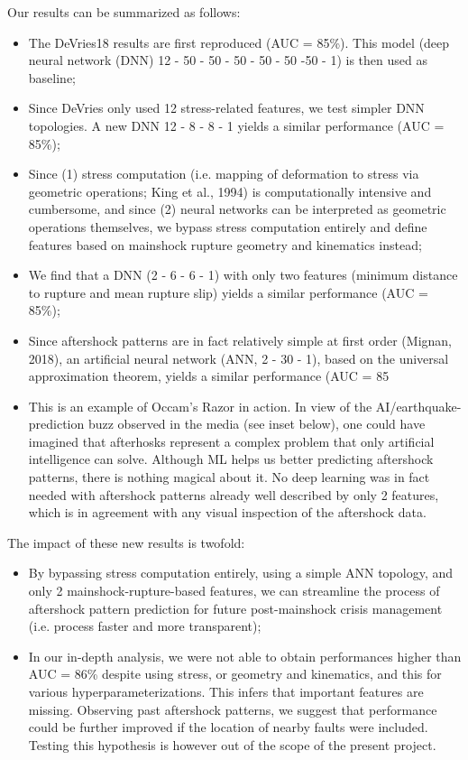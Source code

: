 \documentclass[journal,transmag]{IEEEtran}
\begin{document}
Our results can be summarized as follows:
\begin{itemize}
  \item \par The DeVries18 results are first reproduced (AUC = 85\%). This model (deep neural network (DNN) 12 - 50 - 50 - 50 - 50 - 50 -50 - 1) is then used as baseline;
  \item \par Since DeVries only used 12 stress-related features, we test simpler DNN topologies. A new DNN 12 - 8 - 8 - 1 yields a similar performance (AUC = 85\%);
  \item \par Since (1) stress computation (i.e. mapping of deformation to stress via geometric operations; King et al., 1994) is computationally intensive and cumbersome, and since (2) neural networks can be interpreted as geometric operations themselves, we bypass stress computation entirely and define features based on mainshock rupture geometry and kinematics instead;
  \item \par We find that a DNN (2 - 6 - 6 - 1) with only two features (minimum distance to rupture and mean rupture slip) yields a similar performance (AUC = 85\%);
  \item \par Since aftershock patterns are in fact relatively simple at first order (Mignan, 2018), an artificial neural network (ANN, 2 - 30 - 1), based on the universal approximation theorem, yields a similar performance (AUC = 85%
  \item \par This is an example of Occam's Razor in action. In view of the AI/earthquake-prediction buzz observed in the media (see inset below), one could have imagined that afterhosks represent a complex problem that only artificial intelligence can solve. Although ML helps us better predicting aftershock patterns, there is nothing magical about it. No deep learning was in fact needed with aftershock patterns already well described by only 2 features, which is in agreement with any visual inspection of the aftershock data.
\end{itemize}

The impact of these new results is twofold:

\begin{itemize}
  \item By bypassing stress computation entirely, using a simple ANN topology, and only 2 mainshock-rupture-based features, we can streamline the process of aftershock pattern prediction for future post-mainshock crisis management (i.e. process faster and more transparent);
  \item In our in-depth analysis, we were not able to obtain performances higher than AUC = 86\% despite using stress, or geometry and kinematics, and this for various hyperparameterizations. This infers that important features are missing. Observing past aftershock patterns, we suggest that performance could be further improved if the location of nearby faults were included. Testing this hypothesis is however out of the scope of the present project.
\end{itemize}
\end{document}
